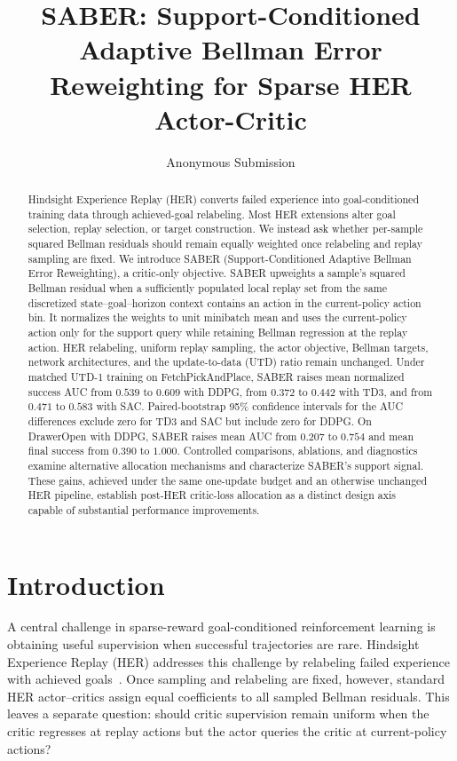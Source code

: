 \documentclass[letterpaper]{article}
\title{SABER: Support-Conditioned Adaptive Bellman Error Reweighting for Sparse HER Actor-Critic}
\author{Anonymous Submission}
\begin{document}
\maketitle

\begin{abstract}
Hindsight Experience Replay (HER) converts failed experience into goal-conditioned training data through achieved-goal relabeling. Most HER extensions alter goal selection, replay selection, or target construction. We instead ask whether per-sample squared Bellman residuals should remain equally weighted once relabeling and replay sampling are fixed. We introduce SABER (Support-Conditioned Adaptive Bellman Error Reweighting), a critic-only objective. SABER upweights a sample's squared Bellman residual when a sufficiently populated local replay set from the same discretized state--goal--horizon context contains an action in the current-policy action bin. It normalizes the weights to unit minibatch mean and uses the current-policy action only for the support query while retaining Bellman regression at the replay action. HER relabeling, uniform replay sampling, the actor objective, Bellman targets, network architectures, and the update-to-data (UTD) ratio remain unchanged. Under matched UTD-1 training on FetchPickAndPlace, SABER raises mean normalized success AUC from \(0.539\) to \(0.609\) with DDPG, from \(0.372\) to \(0.442\) with TD3, and from \(0.471\) to \(0.583\) with SAC. Paired-bootstrap 95\% confidence intervals for the AUC differences exclude zero for TD3 and SAC but include zero for DDPG. On DrawerOpen with DDPG, SABER raises mean AUC from \(0.207\) to \(0.754\) and mean final success from \(0.390\) to \(1.000\). Controlled comparisons, ablations, and diagnostics examine alternative allocation mechanisms and characterize SABER's support signal. These gains, achieved under the same one-update budget and an otherwise unchanged HER pipeline, establish post-HER critic-loss allocation as a distinct design axis capable of substantial performance improvements.
\end{abstract}

\section{Introduction}

A central challenge in sparse-reward goal-conditioned reinforcement learning is obtaining useful supervision when successful trajectories are rare. Hindsight Experience Replay (HER) addresses this challenge by relabeling failed experience with achieved goals~\citep{andrychowicz2017her}. Once sampling and relabeling are fixed, however, standard HER actor--critics assign equal coefficients to all sampled Bellman residuals. This leaves a separate question: should critic supervision remain uniform when the critic regresses at replay actions but the actor queries the critic at current-policy actions?
\end{document}
